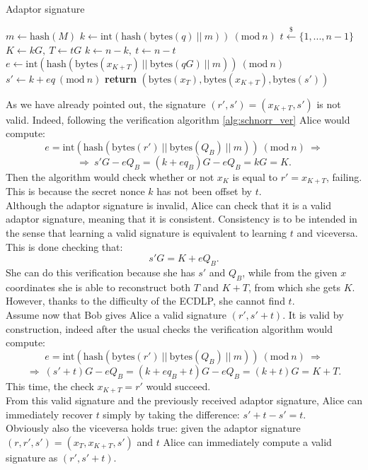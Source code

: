 \begin{algorithm}
	\caption{Adaptor signature}
	\label{alg:adaptor}
	\begin{algorithmic}[1]
		\State $m \gets \text{hash}(M)$
		\State $k \gets \text{int}(\text{hash}(\text{bytes}(q) \ || \ m)) \ (\text{mod} \ n)$
		\State $t \xleftarrow{\text{\$}} \{1, ..., n - 1\}$
		\State $K \gets kG, \ T \gets tG$
		\State $k \gets n - k, \ t \gets n - t$
		\EndIf
		\State $e \gets \text{int}(\text{hash}(\text{bytes}(x_{K + T}) \ || \ \text{bytes}(qG) \ || \ m)) \ (\text{mod} \ n)$
		\State $s' \gets k + eq \ (\text{mod} \ n)$
		\State \textbf{return} $(\text{bytes}(x_T), \text{bytes}(x_{K + T}), \text{bytes}(s'))$
		\EndProcedure
	\end{algorithmic}
\end{algorithm}

\bigskip
\noindent
As we have already pointed out, the signature $(r', s') = (x_{K + T}, s')$ is not valid. Indeed, following the verification algorithm \ref{alg:schnorr_ver} Alice would compute:
$$e = \text{int}(\text{hash}(\text{bytes}(r') \ || \ \text{bytes}(Q_B) \ || \ m)) \ (\text{mod} \ n) \ \Longrightarrow$$
$$\Longrightarrow \ s'G - eQ_B = (k + eq_B)G - eQ_B = kG = K.$$
Then the algorithm would check whether or not $x_K$ is equal to $r' = x_{K + T}$, failing. This is because the secret nonce $k$ has not been offset by $t$.
\\
Although the adaptor signature is invalid, Alice can check that it is a valid adaptor signature, meaning that it is consistent. Consistency is to be intended in the sense that learning a valid signature is equivalent to learning $t$ and viceversa. This is done checking that:
$$s'G = K + eQ_B.$$
She can do this verification because she has $s'$ and $Q_B$, while from the given $x$ coordinates she is able to reconstruct both $T$ and $K + T$, from which she gets $K$. However, thanks to the difficulty of the ECDLP, she cannot find $t$.
\\
Assume now that Bob gives Alice a valid signature $(r', s' + t)$. It is valid by construction, indeed after the usual checks the verification algorithm would compute:
$$e = \text{int}(\text{hash}(\text{bytes}(r') \ || \ \text{bytes}(Q_B) \ || \ m)) \ (\text{mod} \ n) \ \Longrightarrow$$
$$\Longrightarrow \ (s' + t)G - eQ_B = (k + eq_B + t)G - eQ_B = (k + t)G = K + T.$$
This time, the check $x_{K + T} = r'$ would succeed. 
\\
From this valid signature and the previously received adaptor signature, Alice can immediately recover $t$ simply by taking the difference: $s' + t - s' = t$.
\\
Obviously also the viceversa holds true: given the adaptor signature $(r, r', s') = (x_T, x_{K + T}, s')$ and $t$ Alice can immediately compute a valid signature as $(r', s' + t)$.

